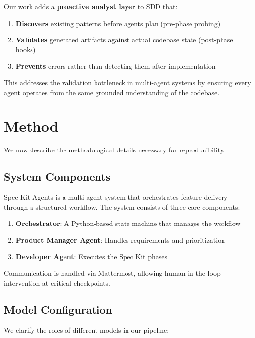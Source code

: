 \documentclass[sigconf,anonymous,review]{acmart}
\begin{document}
Our work adds a \textbf{proactive analyst layer} to SDD that:

\begin{enumerate}
  \item \textbf{Discovers} existing patterns before agents plan (pre-phase probing)
  \item \textbf{Validates} generated artifacts against actual codebase state (post-phase hooks)
  \item \textbf{Prevents} errors rather than detecting them after implementation
\end{enumerate}

This addresses the validation bottleneck in multi-agent systems by ensuring every agent operates from the same grounded understanding of the codebase.

\section{Method}

We now describe the methodological details necessary for reproducibility.

\subsection{System Components}

Spec Kit Agents is a multi-agent system that orchestrates feature delivery through a structured workflow. The system consists of three core components:

\begin{enumerate}
  \item \textbf{Orchestrator}: A Python-based state machine that manages the workflow
  \item \textbf{Product Manager Agent}: Handles requirements and prioritization
  \item \textbf{Developer Agent}: Executes the Spec Kit phases
\end{enumerate}

Communication is handled via Mattermost, allowing human-in-the-loop intervention at critical checkpoints.

\subsection{Model Configuration}

We clarify the roles of different models in our pipeline:
\end{document}
